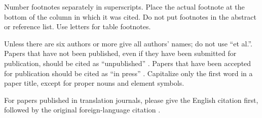 \documentclass[conference]{IEEEtran}
\begin{document}
Number footnotes separately in superscripts. Place the actual footnote at 
the bottom of the column in which it was cited. Do not put footnotes in the 
abstract or reference list. Use letters for table footnotes.

Unless there are six authors or more give all authors' names; do not use 
``et al.''. Papers that have not been published, even if they have been 
submitted for publication, should be cited as ``unpublished'' \cite{b4}. Papers 
that have been accepted for publication should be cited as ``in press'' \cite{b5}. 
Capitalize only the first word in a paper title, except for proper nouns and 
element symbols.

For papers published in translation journals, please give the English 
citation first, followed by the original foreign-language citation \cite{b6}.
\end{document}
